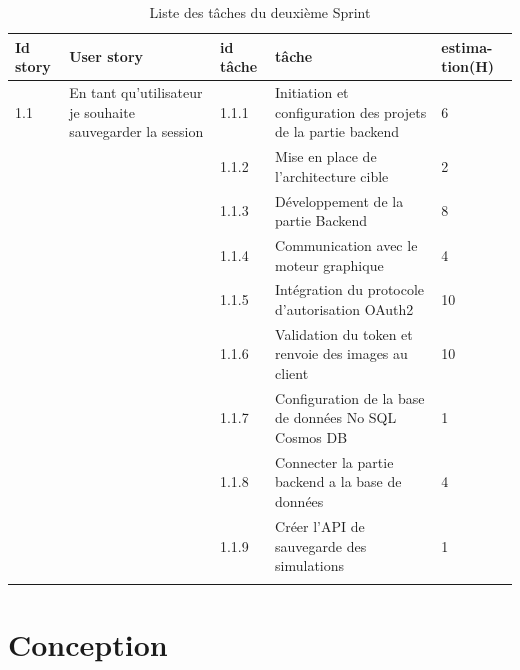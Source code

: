 \begin{longtable}[!ht]{|m{1cm}|m{3cm}|m{1cm}|m{7cm}|m{1.3cm}|}
\hline
{\textbf{Id story}} & {\textbf{User story}} & {\textbf{id tâche}} & {\textbf{tâche}} & {\textbf{estima-tion(H)}}\\
\hline
1.1 & En tant qu’utilisateur je souhaite sauvegarder la session  & 1.1.1 & Initiation et configuration des projets de la partie backend & 6\\
\cline{3-5}
&   & 1.1.2 & Mise en place de l’architecture cible & 2\\
\cline{3-5}
&	& 1.1.3 & Développement de la partie Backend & 8\\
\cline{3-5}
&	& 1.1.4 & Communication avec le moteur graphique & 4\\
\cline{3-5}
&	& 1.1.5 & Intégration du protocole d’autorisation OAuth2 & 10\\
\cline{3-5}
&	& 1.1.6 & Validation du token et renvoie des images au client & 10\\
\cline{3-5}
&	& 1.1.7 & Configuration de la base de données No SQL Cosmos DB & 1\\
\cline{3-5}
&	& 1.1.8 & Connecter la partie backend a la base de données & 4\\
\cline{3-5}
&	& 1.1.9 & Créer l’API de sauvegarde des simulations & 1\\
\hline
\caption{Liste des tâches du deuxième Sprint}
\label{tab:sprint_4_backlog}
\end{longtable}

\section{Conception}
